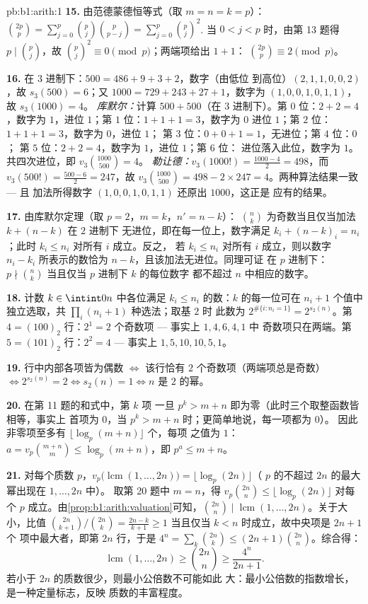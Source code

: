 \begin{solution}{pb:b1:arith:1}
\textbf{15.} 由范德蒙德恒等式（取 $m = n = k = p$）：$\binom{2p}p =
\sum_{j=0}^p \binom pj\binom p{p-j} = \sum_{j=0}^p \binom pj^2$.
当 $0 < j < p$ 时，由第 13 题得 $p \mid \binom pj$，故 $\binom
pj^2 \equiv 0 \pmod p$；两端项给出 $1 + 1$：
$\binom{2p}p \equiv 2 \pmod p$。

\textbf{16.} 在 $3$ 进制下：$500 = 486 + 9 + 3 + 2$，数字（由低位
到高位）$(2, 1, 1, 0, 0, 2)$，故 $s_3(500) = 6$；又 $1000 = 729 +
243 + 27 + 1$，数字为 $(1, 0, 0, 1, 0, 1, 1)$，故 $s_3(1000) = 4$。
\emph{库默尔：}计算 $500 + 500$（在 $3$ 进制下）。第 $0$ 位：$2 + 2 =
4$，数字为 $1$，进位 $1$；第 $1$ 位：$1 + 1 + 1 = 3$，数字为 $0$
进位 $1$；第 $2$ 位：$1 + 1 + 1 = 3$，数字为 $0$，进位 $1$；
第 $3$ 位：$0 + 0 + 1 = 1$，无进位；第 $4$ 位：$0$；
第 $5$ 位：$2 + 2 = 4$，数字为 $1$，进位 $1$；第 $6$ 位：
进位落入此位，数字为 $1$。共四次进位，即 $v_3\binom{1000}{500} = 4$。
\emph{勒让德：}$v_3(1000!) = \frac{1000 - 4}2 = 498$，而
$v_3(500!) = \frac{500 - 6}2 = 247$，故 $v_3\binom{1000}{500} =
498 - 2\times247 = 4$。两种算法结果一致 --- 且
加法所得数字 $(1, 0, 0, 1, 0, 1, 1)$ 还原出 $1000$，这正是
应有的结果。

\textbf{17.} 由库默尔定理（取 $p = 2$，$m = k$，$n' = n - k$）：
$\binom nk$ 为奇数当且仅当加法 $k + (n - k)$ 在 $2$ 进制下
无进位，即在每一位上，数字满足 $k_i + (n -
k)_i = n_i$；此时 $k_i \leq n_i$ 对所有 $i$ 成立。反之，
若 $k_i \leq n_i$ 对所有 $i$ 成立，则以数字 $n_i -
k_i$ 所表示的数恰为 $n - k$，且该加法无进位。同理可证
在 $p$ 进制下：$p \nmid \binom nk$ 当且仅当 $p$ 进制下 $k$ 的每位数字
都不超过 $n$ 中相应的数字。

\textbf{18.} 计数 $k \in \intint0n$ 中各位满足
$k_i \leq n_i$ 的数：$k$ 的每一位可在
$n_i + 1$ 个值中独立选取，共 $\prod_i (n_i + 1)$ 种选法；取基 $2$ 时
此数为 $2^{\#\{i : n_i = 1\}} = 2^{s_2(n)}$。第 $4 =
(100)_2$ 行：$2^1 = 2$ 个奇数项 --- 事实上 $1, 4, 6, 4, 1$ 中
奇数项只在两端。第 $5 = (101)_2$ 行：$2^2 = 4$ --- 事实上
$1, 5, 10, 10, 5, 1$。

\textbf{19.} 行中内部各项皆为偶数 $\iff$ 该行恰有
$2$ 个奇数项（两端项总是奇数）$\iff 2^{s_2(n)} =
2 \iff s_2(n) = 1 \iff n$ 是 $2$ 的幂。

\textbf{20.} 在第 11 题的和式中，第 $k$ 项
一旦 $p^k > m + n$ 即为零（此时三个取整函数皆相等，事实上
首项为 $0$，当 $p^k > m+n$ 时；更简单地说，每一项都为 $0$）。
因此非零项至多有 $\lfloor \log_p(m+n)\rfloor$ 个，每项
之值为 $1$：$a = v_p\binom{m+n}m \leq \log_p(m+n)$，即 $p^a \leq
m + n$。

\textbf{21.} 对每个质数 $p$，$v_p\bigl(\operatorname{lcm}(1,
\dots, 2n)\bigr) = \lfloor\log_p(2n)\rfloor$（
$p$ 的不超过 $2n$ 的最大幂出现在 $1, \dots, 2n$ 中）。
取第 20 题中 $m = n$，得 $v_p\binom{2n}n \leq \lfloor\log_p(2n)\rfloor$
对每个 $p$ 成立。由\cref{prop:b1:arith:valuation}可知，$\binom{2n}n
\mid \operatorname{lcm}(1, \dots, 2n)$。关于大小，比值
$\binom{2n}{k+1}/\binom{2n}k = \frac{2n-k}{k+1} \geq 1$ 当且仅当
$k < n$ 时成立，故中央项是 $2n + 1$ 个
项中最大者，即第 $2n$ 行，于是 $4^n = \sum_k \binom{2n}k \leq
(2n+1)\binom{2n}n$。综合得：
\[
\operatorname{lcm}(1, \dots, 2n) \geq \binom{2n}n \geq
\frac{4^n}{2n + 1} .
\]
若小于 $2n$ 的质数很少，则最小公倍数不可能如此
大：最小公倍数的指数增长，是一种定量标志，反映
质数的丰富程度。


\end{solution}
